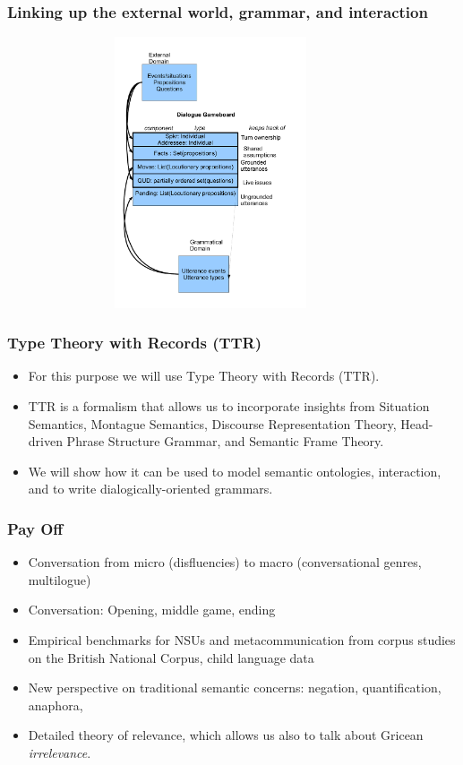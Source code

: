 \documentclass{beamer}
\newcommand{\bit}{\begin{itemize}}
\newcommand{\eit}{\end{itemize}}
\begin{document}
\begin{frame}\frametitle{Linking up the external world, grammar, and interaction}

\includegraphics[height=8cm,width=12cm]{sum2.pdf}

\end{frame}

\begin{frame}\frametitle{Type Theory with Records (TTR) }
\bit

\item For this purpose we will use Type Theory with Records (TTR). 

\item TTR is a formalism that allows
us to incorporate insights from Situation Semantics, Montague
Semantics, Discourse Representation Theory,  Head-driven Phrase
Structure Grammar, and Semantic Frame Theory. 

\item We will show how it
can be used to model semantic ontologies, interaction, and to write
dialogically-oriented grammars.


\eit
\end{frame}


\begin{frame}\frametitle{Pay Off}
\bit

\item \textcolor[rgb]{0.98,0.00,0.00}{Conversation from micro (disfluencies) to macro (conversational genres, multilogue)}
\item \textcolor[rgb]{0.98,0.00,0.00}{Conversation: Opening, middle game, ending }
\item \textcolor[rgb]{0.98,0.00,0.00}{Empirical benchmarks for NSUs and metacommunication from corpus
  studies on the British National Corpus, child language data}
\item New perspective on traditional semantic concerns:
\textcolor[rgb]{0.98,0.00,0.00}{negation},  quantification, anaphora, 
\item \textcolor[rgb]{0.98,0.00,0.00}{Detailed theory of relevance}, which allows us also to talk about Gricean
  {\it irrelevance}.
\eit
\end{frame}
\end{document}
